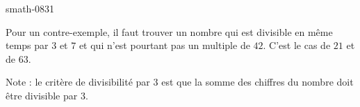 
\begin{corrige}{smath-0831}

    Pour un contre-exemple, il faut trouver un nombre qui est divisible en même temps par \( 3\) et \( 7\) et qui n'est pourtant pas un multiple de \( 42\). C'est le cas de \( 21\) et de \( 63\).

    Note : le critère de divisibilité par \( 3\) est que la somme des chiffres du nombre doit être divisible par \( 3\).

\end{corrige}
